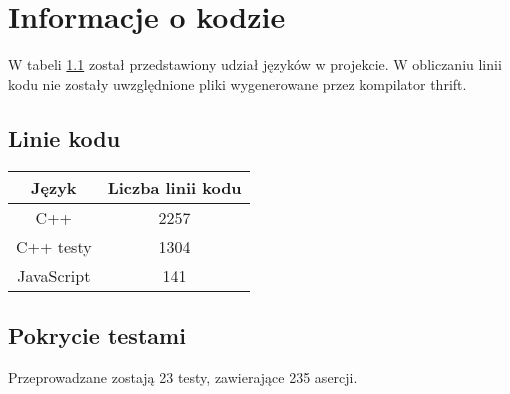 \chapter{Informacje o kodzie}
W tabeli \ref{table:linie_kodu} został przedstawiony udział języków w projekcie. W obliczaniu linii kodu nie zostały uwzględnione pliki wygenerowane przez kompilator thrift.
\section{Linie kodu}
\begin{table}[h]
\begin{tabular}{|c|c|}
\hline
Język & Liczba linii kodu \\ \hline
C++ & 2257 \\ \hline
C++ testy &  1304 \\ \hline
JavaScript & 141 \\ \hline
\end{tabular}
\label{table:linie_kodu}
\end{table}

\section{Pokrycie testami}
Przeprowadzane zostają 23 testy, zawierające 235 asercji.